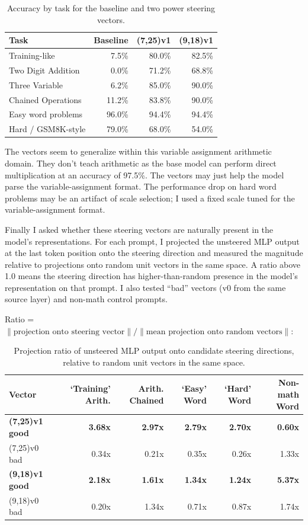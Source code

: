 \documentclass{article}
\begin{document}
\begin{table}[t]
  \centering
  \caption{Accuracy by task for the baseline and two power steering vectors.}
  \label{tab:cot-accuracy}
  \begin{tabular}{lrrr}
    \toprule
    Task & Baseline & (7,25)v1 & (9,18)v1 \\
    \midrule
    Training-like & 7.5\% & 80.0\% & 82.5\% \\
    Two Digit Addition & 0.0\% & 71.2\% & 68.8\% \\
    Three Variable & 6.2\% & 85.0\% & 90.0\% \\
    Chained Operations & 11.2\% & 83.8\% & 90.0\% \\
    Easy word problems & 96.0\% & 94.4\% & 94.4\% \\
    Hard / GSM8K-style & 79.0\% & 68.0\% & 54.0\% \\
    \bottomrule
  \end{tabular}
\end{table}

The vectors seem to generalize within this variable assignment arithmetic domain. They don't teach arithmetic as the base model can perform direct multiplication at an accuracy of 97.5\%. The vectors may just help the model parse the variable-assignment format. The performance drop on hard word problems may be an artifact of scale selection; I used a fixed scale tuned for the variable-assignment format.

Finally I asked whether these steering vectors are naturally present in the model's representations. For each prompt, I projected the unsteered MLP output at the last token position onto the steering direction and measured the magnitude relative to projections onto random unit vectors in the same space. A ratio above 1.0 means the steering direction has higher-than-random presence in the model's representation on that prompt. I also tested ``bad'' vectors (v0 from the same source layer) and non-math control prompts.

Ratio = $\|\text{projection onto steering vector}\| / \|\text{mean projection onto random vectors}\|$:

\begin{table}[t]
  \centering
  \caption{Projection ratio of unsteered MLP output onto candidate steering directions, relative to random unit vectors in the same space.}
  \label{tab:projection-ratio}
  \begin{tabular}{lrrrrr}
    \toprule
    Vector & `Training' Arith. & Arith. Chained & `Easy' Word & `Hard' Word & Non-math Word \\
    \midrule
    \textbf{(7,25)v1 good} & \textbf{3.68x} & \textbf{2.97x} & \textbf{2.79x} & \textbf{2.70x} & \textbf{0.60x} \\
    (7,25)v0 bad & 0.34x & 0.21x & 0.35x & 0.26x & 1.33x \\
    \textbf{(9,18)v1 good} & \textbf{2.18x} & \textbf{1.61x} & \textbf{1.34x} & \textbf{1.24x} & \textbf{5.37x} \\
    (9,18)v0 bad & 0.20x & 1.34x & 0.71x & 0.87x & 1.74x \\
    \bottomrule
  \end{tabular}
\end{table}
\end{document}
